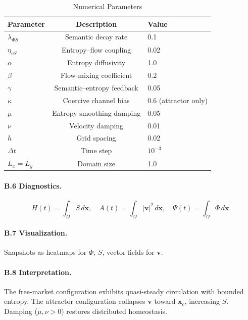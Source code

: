 \documentclass[12pt]{article}
\begin{document}
\begin{table}[h]
\caption{Numerical Parameters}
\begin{center}
\begin{tabular}{lcl}
\toprule
Parameter & Description & Value \\
\midrule
\(\lambda_{\Phi S}\) & Semantic decay rate & 0.1 \\
\(\eta_{vS}\) & Entropy–flow coupling & 0.02 \\
\(\alpha\) & Entropy diffusivity & 1.0 \\
\(\beta\) & Flow-mixing coefficient & 0.2 \\
\(\gamma\) & Semantic–entropy feedback & 0.05 \\
\(\kappa\) & Coercive channel bias & 0.6 (attractor only) \\
\(\mu\) & Entropy-smoothing damping & 0.05 \\
\(\nu\) & Velocity damping & 0.01 \\
\(h\) & Grid spacing & 0.02 \\
\(\Delta t\) & Time step & \(10^{-3}\) \\
\(L_x = L_y\) & Domain size & 1.0 \\
\bottomrule
\end{tabular}
\end{center}
\end{table}

\paragraph{B.6 Diagnostics.}

\[
H(t) = \int_{\Omega} S \, d\mathbf{x}, \quad A(t) = \int_{\Omega} |\mathbf{v}|^2 \, d\mathbf{x}, \quad \Psi(t) = \int_{\Omega} \Phi \, d\mathbf{x}.
\]

\paragraph{B.7 Visualization.}

Snapshots as heatmaps for \(\Phi\), \(S\), vector fields for \(\mathbf{v}\).

\paragraph{B.8 Interpretation.}

The free-market configuration exhibits quasi-steady circulation with bounded entropy. The attractor configuration collapses \(\mathbf{v}\) toward \(\mathbf{x}_c\), increasing \(S\). Damping (\(\mu, \nu > 0\)) restores distributed homeostasis.
\end{document}
